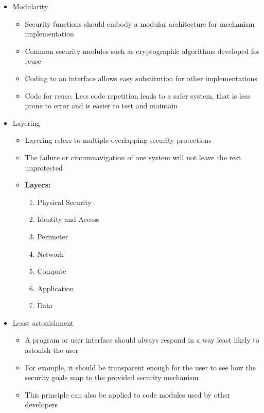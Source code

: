 \documentclass[12pt]{article}
\begin{document}
\begin{itemize}
\begin{itemize}
                \end{itemize}
            \item Modularity
                \begin{itemize}
                    \item Security functions should embody a modular architecture for mechanism implementation
                    \item Common security modules such as cryptographic algorithms developed for reuse
                    \item Coding to an interface allows easy substitution for other implementations
                    \item Code for reuse. Less code repetition leads to a safer system, that is less prone to error
                    and is easier to test and maintain
                \end{itemize}
            \item Layering
                \begin{itemize}
                    \item Layering refers to multiple overlapping security protections
                    \item The failure or circumnavigation of one system will not leave the rest unprotected
                    \item \textbf{Layers:}
                        \begin{enumerate}
                            \item Physical Security
                            \item Identity and Access
                            \item Perimeter
                            \item Network
                            \item Compute
                            \item Application
                            \item Data
                        \end{enumerate}
                \end{itemize}
            \item Least astonishment
                \begin{itemize}
                    \item A program or user interface should always respond in a way least likely to astonish the user
                    \item For example, it should be transparent enough for the user to see how the security goals
                    map to the provided security mechanism
                    \item This principle can also be applied to code modules used by other developers
                \end{itemize}
        \end{itemize}
\end{document}
